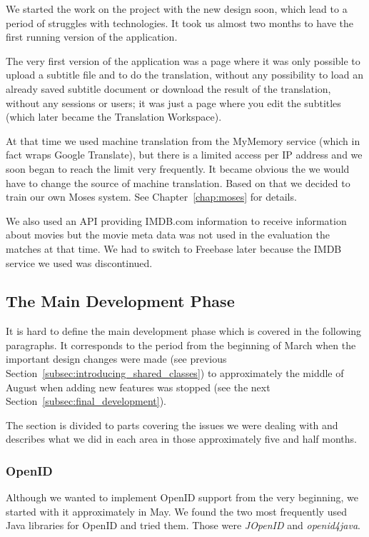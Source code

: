 We started the work on the project with the new design soon, which lead to a period of struggles with technologies. It took us almost two months to have the first running version of the application.

The very first version of the application was a page where it was only possible to upload a subtitle file and to do the translation, without any possibility to load an already saved subtitle document or download the result of the translation, without any sessions or users; it was just a page where you edit the subtitles (which later became the Translation Workspace).

At that time we used machine translation from the MyMemory service (which in fact wraps Google Translate), but there is a limited access per IP address and we soon began to reach the limit very frequently. It became obvious the we would have to change the source of machine translation. Based on that we decided to train our own Moses system. See Chapter~\ref{chap:moses} for details.

We also used an API providing IMDB.com information to receive information 
about movies but the movie meta data was not used in the evaluation the 
matches at that time. We had to switch to Freebase later because the IMDB service we used was discontinued.

\subsection{The Main Development Phase}

It is hard to define the main development phase which is covered in the 
following paragraphs. It corresponds to the period from the beginning of 
March when the important design changes were made (see previous 
Section~\ref{subsec:introducing_shared_classes}) to approximately the 
middle of August when adding new features was stopped (see the next 
Section~\ref{subsec:final_development}).

The section is divided to parts covering the issues we were dealing with 
and describes what we did in each area in those approximately five and 
half months.

\subsubsection{OpenID}
\label{subsubsec:openid}

Although we wanted to implement OpenID support from the very beginning, 
we started with it approximately in May. We found the two most frequently 
used Java libraries for OpenID and tried them. Those were \emph{JOpenID} 
and \emph{openid4java}.

